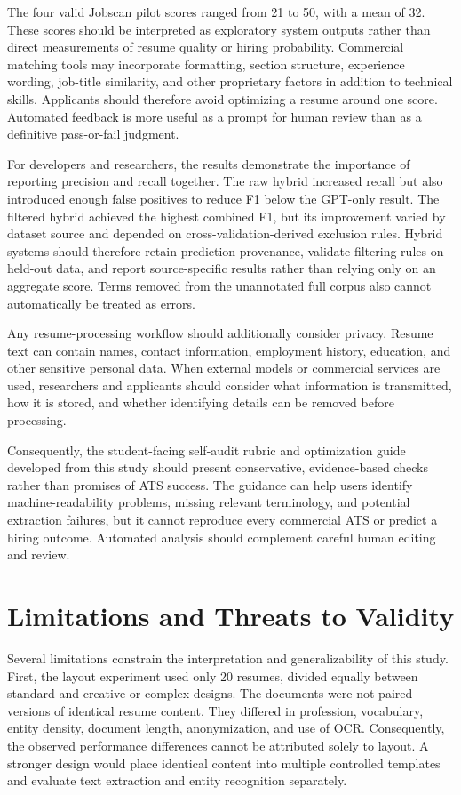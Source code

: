 \documentclass[conference]{IEEEtran}
\begin{document}
The four valid Jobscan pilot scores ranged from 21 to 50, with a mean of
32. These scores should be interpreted as exploratory system outputs
rather than direct measurements of resume quality or hiring probability.
Commercial matching tools may incorporate formatting, section structure,
experience wording, job-title similarity, and other proprietary factors
in addition to technical skills. Applicants should therefore avoid
optimizing a resume around one score. Automated feedback is more useful
as a prompt for human review than as a definitive pass-or-fail judgment.

For developers and researchers, the results demonstrate the importance
of reporting precision and recall together. The raw hybrid increased
recall but also introduced enough false positives to reduce F1 below the
GPT-only result. The filtered hybrid achieved the highest combined F1,
but its improvement varied by dataset source and depended on
cross-validation-derived exclusion rules. Hybrid systems should therefore
retain prediction provenance, validate filtering rules on held-out data,
and report source-specific results rather than relying only on an
aggregate score. Terms removed from the unannotated full corpus also
cannot automatically be treated as errors.

Any resume-processing workflow should additionally consider privacy.
Resume text can contain names, contact information, employment history,
education, and other sensitive personal data. When external models or
commercial services are used, researchers and applicants should consider
what information is transmitted, how it is stored, and whether identifying
details can be removed before processing.

Consequently, the student-facing self-audit rubric and optimization guide
developed from this study should present conservative, evidence-based
checks rather than promises of ATS success. The guidance can help users
identify machine-readability problems, missing relevant terminology, and
potential extraction failures, but it cannot reproduce every commercial
ATS or predict a hiring outcome. Automated analysis should complement
careful human editing and review.

\section{Limitations and Threats to Validity}

Several limitations constrain the interpretation and generalizability of
this study. First, the layout experiment used only 20 resumes, divided
equally between standard and creative or complex designs. The documents
were not paired versions of identical resume content. They differed in
profession, vocabulary, entity density, document length, anonymization,
and use of OCR. Consequently, the observed performance differences cannot
be attributed solely to layout. A stronger design would place identical
content into multiple controlled templates and evaluate text extraction
and entity recognition separately.
\end{document}
